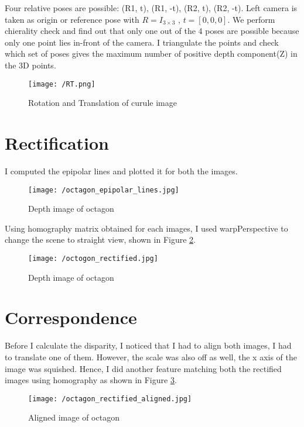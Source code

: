 \documentclass[a4paper, 10pt]{article}
\begin{document}
\begin{multicols}{2}
		Four relative poses are possible: (R1, t), (R1, -t), (R2, t), (R2, -t). Left camera is taken as origin or reference pose with $R = I_{3×3}$ , $t = [0, 0, 0]$. We perform chierality check and find out that only one out of the 4 poses are possible because only one point lies in-front of the camera. I triangulate the points and check which set of poses gives the maximum number of positive depth component(Z) in the 3D points.
	
		\begin{figure}[H]
			\centering
			\texttt{[image: /RT.png]}
			\caption{Rotation and Translation of curule image}
			\label{fig:rt}
		\end{figure}
		
		
		\section{Rectification}
		
		I computed the epipolar lines and plotted it for both the images. 
		
		
		\begin{figure}[H]
			\centering
			\texttt{[image: /octagon\_epipolar\_lines.jpg]}
			\caption{Depth image of octagon}
		\end{figure}
		
		Using homography matrix obtained for each images, I used warpPerspective to change the scene to straight view, shown in Figure \ref{fig:octagon_straight}.
		
		\begin{figure}[H]
			\centering
			\texttt{[image: /octogon\_rectified.jpg]}
			\caption{Depth image of octagon}
			\label{fig:octagon_straight}
		\end{figure}
	
	
		
		\section{Correspondence}	
		Before I calculate the disparity, I noticed that I had to align both images, I had to translate one of them. However, the scale was also off as well, the x axis of the image was squished. Hence, I did another feature matching both the rectified images using homography as shown in Figure \ref{fig:octagon_aligned}. 
		
		\begin{figure}[H]
			\centering
			\texttt{[image: /octagon\_rectified\_aligned.jpg]}
			\caption{Aligned image of octagon}
			\label{fig:octagon_aligned}
		\end{figure}
		

\end{multicols}
\end{document}
